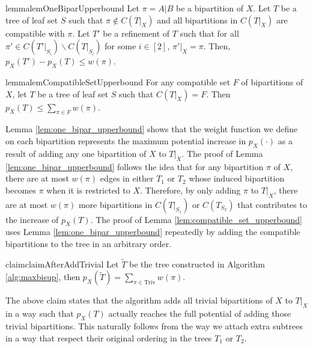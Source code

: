 \documentclass{bmcart}
\newcommand{\triv}{\mathrm{Triv}}
\theoremstyle{mystyle}
\theoremstyle{proofstyle}
\begin{document}
\begin{restatable}{lemma}{lemOneBiparUpperbound} \label{lem:one_bipar_upperbound}
    Let $\pi = A|B$ be a bipartition of $X$. Let $T$ be a tree of leaf set $S$ such that $\pi \notin C(T|_X)$ and all bipartitions in $C(T|_X)$ are compatible with $\pi$. Let $T'$ be a refinement of $T$ such that for all $\pi' \in C(T'|_{S_i}) \backslash C(T|_{S_i})$ for some $i \in [2]$, $\pi'|_X = \pi$. Then, $p_X(T') - p_X(T) \le w(\pi)$. 
\end{restatable}

\begin{restatable}{lemma}{lemCompatibleSetUpperbound} \label{lem:compatible_set_upperbound}
    For any compatible set $F$ of bipartitions of $X$, let $T$ be a tree of leaf set $S$ such that $C(T|_X) = F$. Then $p_X(T) \le \sum_{\pi \in F} w(\pi)$.
\end{restatable}
Lemma \ref{lem:one_bipar_upperbound} shows that the weight function we define on each bipartition represents the maximum potential increase in $p_X(\cdot)$ as a result of adding any one bipartition of $X$ to $T|_X$. The proof of Lemma \ref{lem:one_bipar_upperbound} follows the idea that for any bipartition $\pi$ of $X$, there are at most $w(\pi)$ edges in either $T_1$ or $T_2$ whose induced bipartition becomes $\pi$ when it is restricted to $X$. Therefore, by only adding $\pi$ to $T|_X$, there are at most $w(\pi)$ more bipartitions in $C(T|_{S_1})$ or $C(T_{S_2})$ that contributes to the increase of $p_X(T)$. The proof of Lemma \ref{lem:compatible_set_upperbound} uses Lemma \ref{lem:one_bipar_upperbound} repeatedly by adding the compatible bipartitions to the tree in an arbitrary order. \smallskip

\begin{restatable}{claim}{claimAfterAddTrivial}\label{claim:after_add_trivial}
    Let $\tilde{T}$ be the tree constructed in Algorithm \ref{alg:maxbisup}, then $p_X(\tilde{T}) = \sum_{\pi \in \triv} w(\pi)$. 
\end{restatable}
The above claim states that the algorithm adds all trivial bipartitions of $X$ to $T|_X$ in a way such that $p_X(T)$ actually reaches the full potential of adding those trivial bipartitions. This naturally follows from the way we attach extra subtrees in a way that respect their original ordering in the trees $T_1$ or $T_2$. \smallskip
\end{document}

